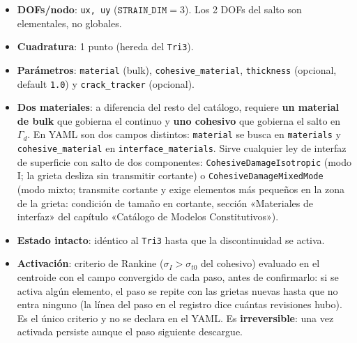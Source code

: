 \documentclass[11pt,oneside]{report}
\begin{document}
\begin{itemize}
  \item \textbf{DOFs/nodo}: \texttt{ux, uy} ($\texttt{STRAIN\_DIM} = 3$). Los 2 DOFs del salto son elementales, no globales.
  \item \textbf{Cuadratura}: 1 punto (hereda del \texttt{Tri3}).
  \item \textbf{Parámetros}: \texttt{material} (bulk), \texttt{cohesive\_\allowbreak{}material}, \texttt{thickness} (opcional, default \texttt{1.0}) y \texttt{crack\_tracker} (opcional).
  \item \textbf{Dos materiales}: a diferencia del resto del catálogo, requiere \textbf{un material de bulk} que gobierna el continuo y \textbf{uno cohesivo} que gobierna el salto en $\Gamma_d$. En YAML son dos campos distintos: \texttt{material} se busca en \texttt{materials} y \texttt{cohesive\_\allowbreak{}material} en \texttt{interface\_\allowbreak{}materials}. Sirve cualquier ley de interfaz de superficie con salto de dos componentes: \texttt{CohesiveDamageIsotropic} (modo I; la grieta desliza sin transmitir cortante) o \texttt{CohesiveDamageMixedMode} (modo mixto; transmite cortante y exige elementos más pequeños en la zona de la grieta: condición de tamaño en cortante, sección «Materiales de interfaz» del capítulo «Catálogo de Modelos Constitutivos»).
  \item \textbf{Estado intacto}: idéntico al \texttt{Tri3} hasta que la discontinuidad se activa.
  \item \textbf{Activación}: criterio de Rankine ($\sigma_I > \sigma_{t0}$ del cohesivo) evaluado en el centroide con el campo convergido de cada paso, antes de confirmarlo: si se activa algún elemento, el paso se repite con las grietas nuevas hasta que no entra ninguno (la línea del paso en el registro dice cuántas revisiones hubo). Es el único criterio y no se declara en el YAML. Es \textbf{irreversible}: una vez activada persiste aunque el paso siguiente descargue.

\end{itemize}
\end{document}
